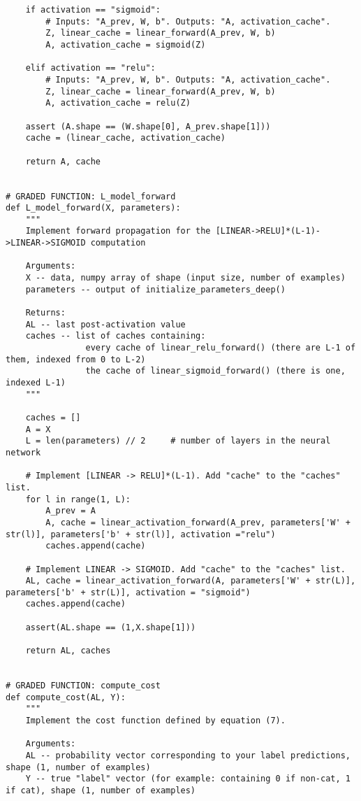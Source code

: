 {\begin{verbatim}
    if activation == "sigmoid":
        # Inputs: "A_prev, W, b". Outputs: "A, activation_cache".
        Z, linear_cache = linear_forward(A_prev, W, b)
        A, activation_cache = sigmoid(Z)
    
    elif activation == "relu":
        # Inputs: "A_prev, W, b". Outputs: "A, activation_cache".
        Z, linear_cache = linear_forward(A_prev, W, b)
        A, activation_cache = relu(Z)
    
    assert (A.shape == (W.shape[0], A_prev.shape[1]))
    cache = (linear_cache, activation_cache)

    return A, cache


# GRADED FUNCTION: L_model_forward
def L_model_forward(X, parameters):
    """
    Implement forward propagation for the [LINEAR->RELU]*(L-1)->LINEAR->SIGMOID computation
    
    Arguments:
    X -- data, numpy array of shape (input size, number of examples)
    parameters -- output of initialize_parameters_deep()
    
    Returns:
    AL -- last post-activation value
    caches -- list of caches containing:
                every cache of linear_relu_forward() (there are L-1 of them, indexed from 0 to L-2)
                the cache of linear_sigmoid_forward() (there is one, indexed L-1)
    """

    caches = []
    A = X
    L = len(parameters) // 2     # number of layers in the neural network
    
    # Implement [LINEAR -> RELU]*(L-1). Add "cache" to the "caches" list.
    for l in range(1, L):
        A_prev = A 
        A, cache = linear_activation_forward(A_prev, parameters['W' + str(l)], parameters['b' + str(l)], activation ="relu")
        caches.append(cache)
    
    # Implement LINEAR -> SIGMOID. Add "cache" to the "caches" list.
    AL, cache = linear_activation_forward(A, parameters['W' + str(L)], parameters['b' + str(L)], activation = "sigmoid")
    caches.append(cache)
    
    assert(AL.shape == (1,X.shape[1]))
            
    return AL, caches


# GRADED FUNCTION: compute_cost
def compute_cost(AL, Y):
    """
    Implement the cost function defined by equation (7).

    Arguments:
    AL -- probability vector corresponding to your label predictions, shape (1, number of examples)
    Y -- true "label" vector (for example: containing 0 if non-cat, 1 if cat), shape (1, number of examples)


\end{verbatim}}
